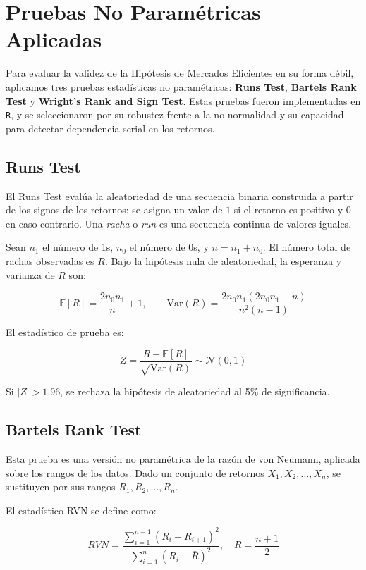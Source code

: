 \documentclass[12pt]{article}
\begin{document}
\section{Pruebas No Paramétricas Aplicadas}

Para evaluar la validez de la Hipótesis de Mercados Eficientes en su forma débil, aplicamos tres pruebas estadísticas no paramétricas: \textbf{Runs Test}, \textbf{Bartels Rank Test} y \textbf{Wright’s Rank and Sign Test}. Estas pruebas fueron implementadas en \texttt{R}, y se seleccionaron por su robustez frente a la no normalidad y su capacidad para detectar dependencia serial en los retornos.

\subsection{Runs Test}

El Runs Test evalúa la aleatoriedad de una secuencia binaria construida a partir de los signos de los retornos: se asigna un valor de $1$ si el retorno es positivo y $0$ en caso contrario. Una \textit{racha} o \textit{run} es una secuencia continua de valores iguales.

Sean $n_1$ el número de 1s, $n_0$ el número de 0s, y $n = n_1 + n_0$. El número total de rachas observadas es $R$. Bajo la hipótesis nula de aleatoriedad, la esperanza y varianza de $R$ son:

\[
\mathbb{E}[R] = \frac{2 n_0 n_1}{n} + 1, \qquad
\text{Var}(R) = \frac{2 n_0 n_1 (2 n_0 n_1 - n)}{n^2 (n - 1)}
\]

El estadístico de prueba es:

\[
Z = \frac{R - \mathbb{E}[R]}{\sqrt{\text{Var}(R)}} \sim \mathcal{N}(0, 1)
\]

Si $|Z| > 1.96$, se rechaza la hipótesis de aleatoriedad al 5\% de significancia.

\subsection{Bartels Rank Test}

Esta prueba es una versión no paramétrica de la razón de von Neumann, aplicada sobre los rangos de los datos. Dado un conjunto de retornos $X_1, X_2, \ldots, X_n$, se sustituyen por sus rangos $R_1, R_2, \ldots, R_n$.

El estadístico RVN se define como:

\[
RVN = \frac{\sum_{i=1}^{n-1} (R_i - R_{i+1})^2}{\sum_{i=1}^{n} (R_i - \bar{R})^2}, \quad \bar{R} = \frac{n+1}{2}
\]
\end{document}
